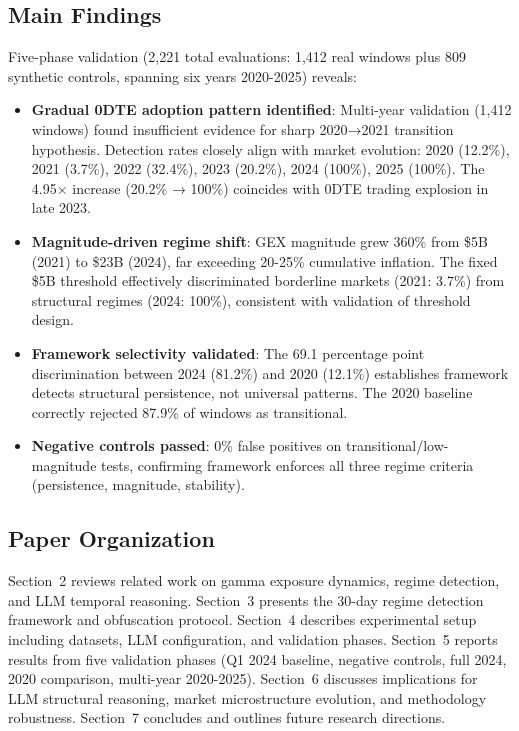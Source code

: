 \subsection{Main Findings}

Five-phase validation (2,221 total evaluations: 1,412 real windows plus 809 synthetic controls, spanning six years 2020-2025) reveals:

\begin{itemize}
\item \textbf{Gradual 0DTE adoption pattern identified}: Multi-year validation (1,412 windows) found insufficient evidence for sharp 2020→2021 transition hypothesis. Detection rates closely align with market evolution: 2020 (12.2\%), 2021 (3.7\%), 2022 (32.4\%), 2023 (20.2\%), 2024 (100\%), 2025 (100\%). The 4.95× increase (20.2\% → 100\%) coincides with 0DTE trading explosion in late 2023.

\item \textbf{Magnitude-driven regime shift}: GEX magnitude grew 360\% from \$5B (2021) to \$23B (2024), far exceeding 20-25\% cumulative inflation. The fixed \$5B threshold effectively discriminated borderline markets (2021: 3.7\%) from structural regimes (2024: 100\%), consistent with validation of threshold design.

\item \textbf{Framework selectivity validated}: The 69.1 percentage point discrimination between 2024 (81.2\%) and 2020 (12.1\%) establishes framework detects structural persistence, not universal patterns. The 2020 baseline correctly rejected 87.9\% of windows as transitional.

\item \textbf{Negative controls passed}: 0\% false positives on transitional/low-magnitude tests, confirming framework enforces all three regime criteria (persistence, magnitude, stability).
\end{itemize}

\subsection{Paper Organization}

Section~2 reviews related work on gamma exposure dynamics, regime detection, and LLM temporal reasoning. Section~3 presents the 30-day regime detection framework and obfuscation protocol. Section~4 describes experimental setup including datasets, LLM configuration, and validation phases. Section~5 reports results from five validation phases (Q1 2024 baseline, negative controls, full 2024, 2020 comparison, multi-year 2020-2025). Section~6 discusses implications for LLM structural reasoning, market microstructure evolution, and methodology robustness. Section~7 concludes and outlines future research directions.
